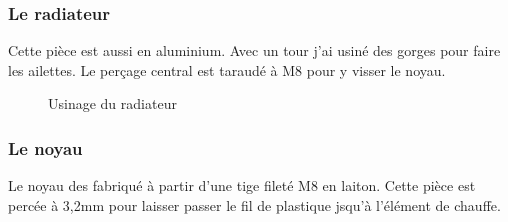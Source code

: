 \subsubsection{Le radiateur}%
Cette pièce est aussi en aluminium. Avec un tour j'ai usiné des gorges pour faire les ailettes.%
Le perçage central est taraudé à M8 pour y visser le noyau.%
\begin{figure}%
   \caption{\label{usinage_radiateur} Usinage du radiateur}%
\end{figure}%
\subsubsection{Le noyau}%
Le noyau des fabriqué à partir d'une tige fileté M8 en laiton. Cette pièce est percée à 3,2mm %
pour laisser passer le fil de plastique jsqu'à l'élément de chauffe.%
